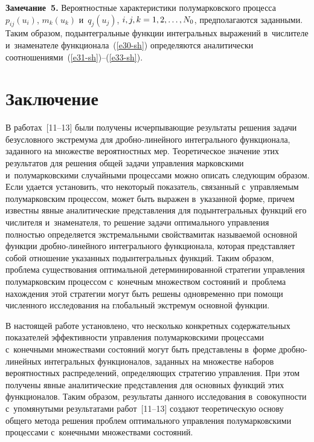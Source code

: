 \begin{multicols}{2}
\noindent
\textbf{Замечание~5.} Вероятностные характеристики полумарковского 
процесса~$p_{ij}(u_i)$, $m_k(u_k)$ и~$q_j(u_j)$, $i,j,k\hm=1,2,\ldots,N_0$, 
предполагаются заданными. Таким образом, подынтегральные функции интегральных 
выражений в~числителе и~знаменателе функционала~(\ref{e30-sh}) определяются аналитически 
соотношениями~(\ref{e31-sh})--(\ref{e33-sh}).

\section{Заключение}

В работах~[11--13] были получены исчерпывающие результаты решения задачи 
безусловного экстремума для дроб\-но-ли\-ней\-но\-го интегрального функционала, 
заданного на множестве вероятностных мер.
Тео\-ре\-ти\-че\-ское значение этих результатов для решения общей задачи управ\-ле\-ния 
марковскими и~полумарковскими случайными процессами можно описать следующим 
образом. Если удается установить, что некоторый показатель, связанный 
с~управ\-ля\-емым полумарковским процессом, может быть выражен в~указанной форме, 
причем известны явные аналитические пред\-став\-ле\-ния для подынтегральных функций 
его числителя и~знаменателя, то решение задачи оптимального управ\-ле\-ния пол\-ностью 
определяется экстремальными свойствами\linebreak так называемой основной функции дроб\-но-ли\-ней\-но\-го 
интегрального функционала, которая пред\-став\-ля\-ет собой отношение 
указанных подынтегральных функций. Таким образом, проб\-ле\-ма \mbox{существования} 
оптимальной детерминированной стратегии управ\-ле\-ния полумарковским процессом 
с~конечным множеством состояний и~проблема нахождения этой стратегии могут быть 
решены одновременно при помощи численного исследования на глобальный экстремум 
основной функции.
{

}

В настоящей работе установлено, что несколько конкретных содержательных 
показателей эффективности управления полумарковскими процессами с~конечными 
множествами состояний могут быть представлены в~форме дроб\-но-ли\-ней\-ных 
интегральных функционалов, заданных на множестве наборов вероятностных 
распределений, определяющих стратегию управления. При этом получены явные 
аналитические представления для основных функций этих функционалов. Таким 
образом, результаты данного исследования в~совокупности с~упомянутыми 
результатами работ~[11--13] создают теоретическую основу общего метода решения 
проб\-лем оптимального управ\-ле\-ния полумарковскими процессами с~конечными 
множествами состояний.



\end{multicols}

